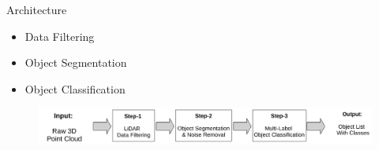 \documentclass[9pt]{beamer}
\begin{document}

\begin{frame}[fragile]{Architecture}
\begin{itemize}
	\item {} Data Filtering  
	\item {} Object Segmentation
	\item {} Object Classification   
\end{itemize}

\begin{figure}
	\centering
	\includegraphics[width=\textwidth]{images/DataProcessingPipleline.pdf}

\end{figure}
\end{frame}


\end{document}
